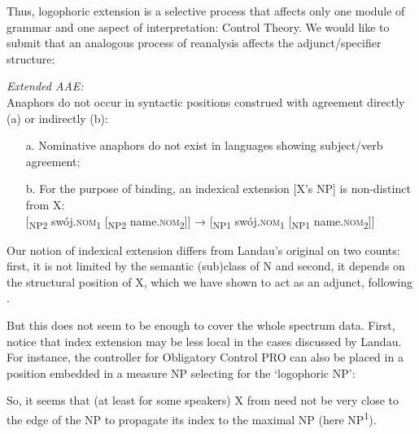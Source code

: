 \documentclass[output=paper,modfonts,nonflat
]{langsci/langscibook}
\begin{document}
\noindent Thus, logophoric extension is a selective process that affects only one module of grammar and one aspect of interpretation: Control Theory. We would like to submit that an analogous process of reanalysis affects the adjunct/specifier structure:

\ea \label{ex:witkos:63}
\textit{Extended AAE:}\\
Anaphors do not occur in syntactic positions construed with agreement directly (a) or indirectly (b):\\
\begin{itemize}
    \item[a.] Nominative anaphors do not exist in languages showing subject/verb agreement;\\
    \item[b.] For the purpose of binding, an indexical extension [X’s NP] is non-distinct from X:\\
    $[$\textsubscript{NP2} swój.\textsc{nom}\textsubscript{1} [\textsubscript{NP2} name.\textsc{nom}\textsubscript{2}$]]$ → [\textsubscript{NP1} swój.\textsc{nom}\textsubscript{1} [\textsubscript{NP1} name.\textsc{nom}\textsubscript{2}$]]$\\
\end{itemize}
\z

\noindent Our notion of indexical extension differs from Landau’s original on two counts: first, it is not limited by the semantic (sub)class of N and second, it depends on the structural position of X, which we have shown to act as an adjunct, following \cite{despic2011,despic2013,despic2015}.

But this does not seem to be enough to cover the whole spectrum data. First, notice that index extension may be less local in the cases discussed by Landau. For instance, the controller for Obligatory Control PRO can also be placed in a position embedded in a measure NP selecting for the ‘logophoric NP’:
    
\z

\noindent So, it seems that (at least for some speakers) X from  need not be very close to the edge of the NP to propagate its index to the maximal NP (here NP\textsuperscript{1}).
\end{document}
